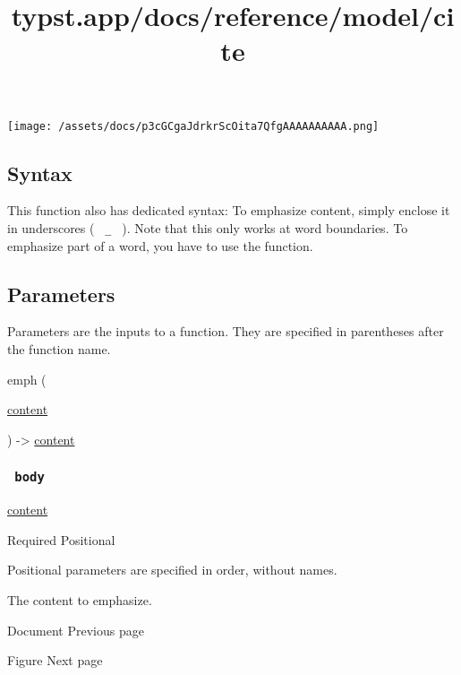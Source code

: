 \texttt{[image: /assets/docs/p3cGCgaJdrkrScOita7QfgAAAAAAAAAA.png]}

\subsection{Syntax}\label{syntax}

This function also has dedicated syntax: To emphasize content, simply
enclose it in underscores ( \texttt{\ \_\ } ). Note that this only works
at word boundaries. To emphasize part of a word, you have to use the
function.

\subsection{\texorpdfstring{{ Parameters
}}{ Parameters }}\label{parameters}

\label{parameters-tooltip}
Parameters are the inputs to a function. They are specified in
parentheses after the function name.

{ emph } (

{ \href{/docs/reference/foundations/content/}{content} }

) -\textgreater{} \href{/docs/reference/foundations/content/}{content}

\subsubsection{\texorpdfstring{\texttt{\ body\ }}{ body }}\label{parameters-body}

\href{/docs/reference/foundations/content/}{content}

{Required} {{ Positional }}

\label{parameters-body-positional-tooltip}
Positional parameters are specified in order, without names.

The content to emphasize.

\href{/docs/reference/model/document/}{\pandocbounded{}}

{ Document } { Previous page }

\href{/docs/reference/model/figure/}{\pandocbounded{}}

{ Figure } { Next page }


\title{typst.app/docs/reference/model/cite}

